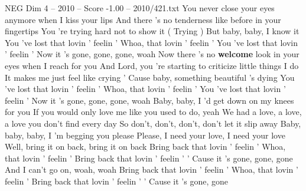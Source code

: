 \begin{textsample}{NEG Dim 4 – 2010 – Score -1.00 – 2010/421.txt}  \label{ex:f4_neg_015}
You never close your eyes anymore when I kiss your lips And there 's no tenderness like before in your fingertips You 're trying hard not to show it ( Trying ) But baby, baby, I know it You 've lost that lovin ' feelin ' Whoa, that lovin ' feelin ' You 've lost that lovin ' feelin ' Now it 's gone, gone, gone, woah Now there 's no \textbf{welcome} look in your eyes when I reach for you And Lord, you 're starting to criticize little things I do It makes me just feel like crying ' Cause baby, something beautiful 's dying You 've lost that lovin ' feelin ' Whoa, that lovin ' feelin ' You 've lost that lovin ' feelin ' Now it 's gone, gone, gone, woah Baby, baby, I 'd get down on my knees for you If you would only love me like you used to do, yeah We had a love, a love, a love you don't find every day So don't, don't, don't, don't let it slip away Baby, baby, baby, I 'm begging you please Please, I need your love, I need your love Well, bring it on back, bring it on back Bring back that lovin ' feelin ' Whoa, that lovin ' feelin ' Bring back that lovin ' feelin ' ' Cause it 's gone, gone, gone And I can't go on, woah, woah Bring back that lovin ' feelin ' Whoa, that lovin ' feelin ' Bring back that lovin ' feelin ' ' Cause it 's gone, gone

\end{textsample}
